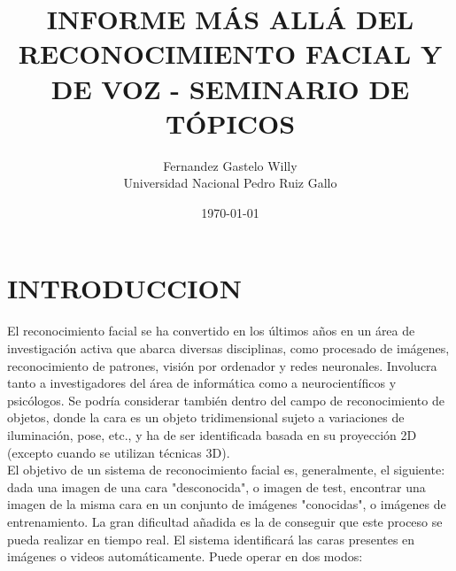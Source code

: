 \documentclass[a4paper,11pt]{article}
\title{INFORME MÁS ALLÁ DEL RECONOCIMIENTO FACIAL Y DE VOZ - SEMINARIO DE TÓPICOS}
\author{ 
	  Fernandez Gastelo Willy\\%
		 Universidad Nacional Pedro Ruiz Gallo}
\date{\today}%
\newcommand{\subfigureautorefname}{\figureautorefname}
\begin{document}
\newpage
\renewcommand{\tablename}{\bfseries Tabla} %
\renewcommand{\figurename}{\bfseries Figura} %
\maketitle
\newpage
\begin{center}
	 \tableofcontents
\end{center}
 \newpage
\begin{center}
	 \listoffigures
\end{center}
 \newpage


\section{INTRODUCCION}
%
El reconocimiento facial se ha convertido en los últimos años en un área de investigación activa que abarca diversas disciplinas, como procesado de imágenes, reconocimiento de patrones, visión por ordenador y redes neuronales. Involucra tanto a investigadores del área de informática como a neurocientíficos y psicólogos. Se podría considerar también dentro del campo de reconocimiento de objetos, donde la cara es un objeto tridimensional sujeto a variaciones de iluminación, pose, etc., y ha de ser identificada basada en su proyección 2D (excepto cuando se utilizan técnicas 3D).\\

El objetivo de un sistema de reconocimiento facial es, generalmente, el siguiente: dada una imagen de una cara "desconocida", o imagen de test, encontrar una imagen de la misma cara en un conjunto de imágenes "conocidas", o imágenes de entrenamiento. La gran dificultad añadida es la de conseguir que este proceso se pueda realizar en tiempo real. El sistema identificará las caras presentes en imágenes o videos automáticamente. Puede operar en dos modos:\\
\end{document}
